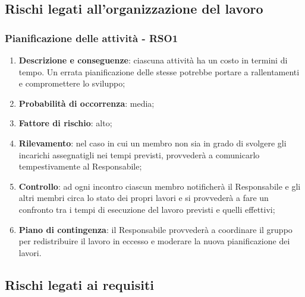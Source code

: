 \subsection{Rischi legati all'organizzazione del lavoro}
	\subsubsection{Pianificazione delle attività - RSO1}
	\begin{enumerate}
		\item \textbf{Descrizione e conseguenze}: ciascuna attività ha un costo in termini di tempo. Un errata pianificazione delle stesse potrebbe portare a rallentamenti e compromettere lo sviluppo; 
		\item \textbf{Probabilità di occorrenza}: media;
		\item \textbf{Fattore di rischio}: alto;
		\item \textbf{Rilevamento}: nel caso in cui un membro non sia in grado di svolgere gli incarichi assegnatigli nei tempi previsti, provvederà a comunicarlo tempestivamente al Responsabile;		
		\item \textbf{Controllo}: ad ogni incontro ciascun membro notificherà il Responsabile e gli altri membri circa lo stato dei propri lavori e si provvederà a fare un confronto tra i tempi di esecuzione del lavoro previsti e quelli effettivi; 
		\item \textbf{Piano di contingenza}: il Responsabile provvederà a coordinare il gruppo per redistribuire il lavoro in eccesso e moderare la nuova pianificazione dei lavori.
	\end{enumerate}
	
\subsection{Rischi legati ai requisiti}
